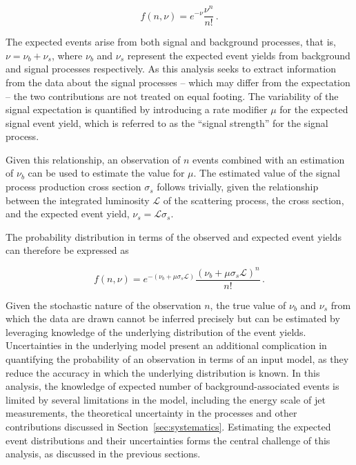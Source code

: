 \begin{equation}
  f(n, \nu) = e^{-\nu}\frac{\nu^{n}}{n!} \,.
\end{equation}

The expected events arise from both signal and background
processes, that is, $\nu = \nu_{b} + \nu_{s}$, where $\nu_{b}$ and $\nu_s$
represent the expected event yields from background and signal processes
respectively. As this analysis seeks to extract information from the data about the signal
processes -- which may differ from the expectation --
the two contributions are not treated on equal footing. 
The variability of the signal expectation is quantified by 
introducing a rate modifier $\mu$ for the expected signal event yield, which
is referred to as the ``signal strength'' for the signal process.

Given this relationship, an observation of $n$ events
combined with an estimation of $\nu_{b}$ can be used to estimate 
the value for $\mu$. The estimated value of the signal process
production cross section $\sigma_{s}$ follows trivially, given the relationship 
between the integrated luminosity $\mathcal{L}$ of the scattering process, the cross section,
and the expected event yield, $\nu_s = \mathcal{L}\sigma_{s}$.

The probability distribution in terms of the 
observed and expected event yields can therefore be expressed as

\begin{equation}
  f(n, \nu) = e^{-(\nu_{b} + \mu\sigma_{s}\mathcal{L})}\frac{(\nu_{b} + \mu\sigma_{s}\mathcal{L})^{n}}{n!} \,.
\end{equation}

Given the stochastic nature of the observation $n$, the 
true value of $\nu_b$ and $\nu_s$ from which the data are drawn cannot be inferred precisely
but can be estimated by
leveraging knowledge of the underlying distribution of the event yields.
Uncertainties in the underlying model present an additional complication
in quantifying the probability of an observation in terms of an input model,
as they reduce the accuracy in which the underlying distribution is known.
In this analysis, the knowledge of expected number of background-associated events
is limited by several limitations in the model, including the energy
scale of jet measurements, the theoretical uncertainty in the \WZ processes
and other contributions discussed in Section~\ref{sec:systematics}.
Estimating the expected event distributions and their uncertainties 
forms the central challenge of this analysis, as discussed in the
previous sections.

